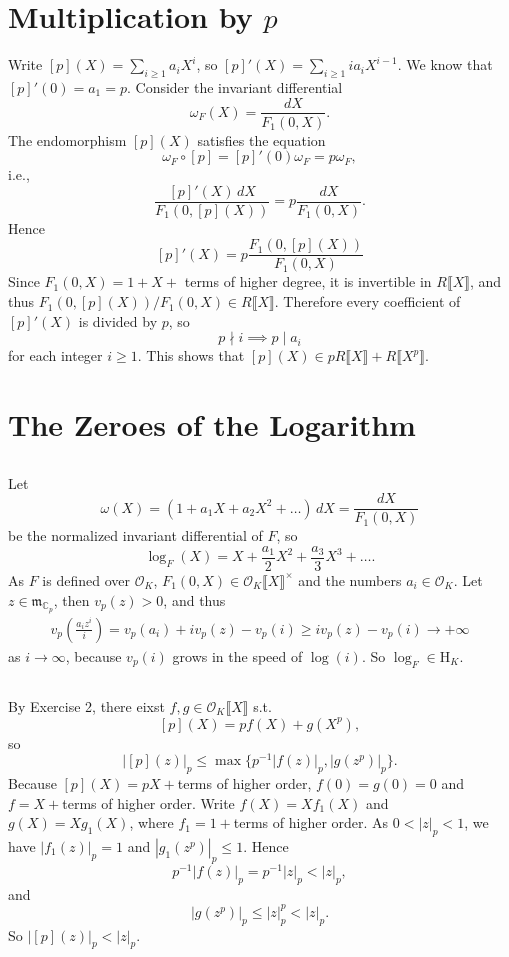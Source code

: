\documentclass{article}
\theoremstyle{definition}
\theoremstyle{remark}
\newcommand{\C}{\mathbb{C}}
\renewcommand{\O}{\mathcal{O}}
\newcommand{\m}{\mathfrak{m}}
\begin{document}
\section{Multiplication by $p$}
Write $[p](X) = \sum_{i\ge 1}a_iX^i$, so $[p]'(X) = \sum_{i\ge 1}ia_iX^{i-1}$. We know that $[p]'(0) = a_1 = p$.
Consider the invariant differential \[\omega_F(X) = \frac{dX}{F_1(0, X)}.\]
The endomorphism $[p](X)$ satisfies the equation\[\omega_F\circ [p] = [p]'(0)\omega_F = p\omega_F,\]
i.e.,\[\frac{[p]'(X)\,dX}{F_1(0, [p](X))} = p\frac{dX}{F_1(0, X)}.\]
Hence \[[p]'(X) = p\frac{F_1(0, [p](X))}{F_1(0, X)}\]
Since $F_1(0, X) = 1 + X + {}$ terms of higher degree, it is invertible in $R\llbracket X\rrbracket$, and thus $F_1(0, [p](X))/F_1(0, X)\in R\llbracket X\rrbracket$. Therefore
every coefficient of $[p]'(X)$ is divided by $p$, so \[p\nmid i\implies p\mid a_i\]
for each integer $i\ge 1$.
This shows that $[p](X)\in pR\llbracket X\rrbracket + R\llbracket X^p\rrbracket$.

\section{The Zeroes of the Logarithm}
\subsection{}
Let \[\omega(X) = (1 + a_1X + a_2X^2 + \dots)\, dX = \frac{dX}{F_1(0, X)}\] be the normalized invariant differential of $F$, so\[\log_F(X) = X + \frac{a_1}{2}X^2 + \frac{a_3}{3}X^3 + \dots.\]
As $F$ is defined over $\O_K$, $F_1(0, X)\in\O_K\llbracket X\rrbracket^\times$ and the numbers $a_i\in\O_K$.
Let $z\in\m_{\C_p}$, then $v_p(z) > 0$, and thus
\begin{align*}
    v_p\left( \frac{a_iz^i}{i} \right) = v_p(a_i) + iv_p(z) - v_p(i)\ge iv_p(z) - v_p(i)\to+\infty
\end{align*} as $i\to\infty$, because $v_p(i)$ grows in the speed of $\log(i)$.
So $\log_F\in\mathrm{H}_K$.

\subsection{}
By Exercise 2, there eixst $f, g\in \O_K\llbracket X\rrbracket$ s.t. \[[p](X) = pf(X) + g(X^p),\]
so \[|[p](z)|_p \le\max \{p^{-1}|f(z)|_p, |g(z^p)|_p\}.\]
Because $[p](X) = pX + {}$terms of higher order,
$f(0) = g(0) = 0$ and $f = X + {}$terms of higher order.
Write $f(X) = Xf_1(X)$ and $g(X) = Xg_1(X)$, where $f_1 = 1 +{}$terms of higher order.
As $0 < |z|_p < 1$, we have $|f_1(z)|_p = 1$ and $|g_1(z^p)|_p \le 1$.
Hence \[p^{-1}|f(z)|_p = p^{-1}|z|_p < |z|_p,\]
and \[|g(z^p)|_p \le |z|_p^p < |z|_p.\]
So $|[p](z)|_p < |z|_p$.
\end{document}
